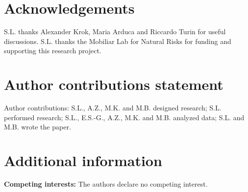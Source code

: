 \documentclass[twocolumn,fleqn,10pt]{wlscirep}
\begin{document}
% 







\section*{Acknowledgements}


S.L. thanks Alexander Krok, Maria Arduca and Riccardo Turin for useful discussions. S.L. thanks the Mobiliar Lab for Natural Risks for funding and supporting this research project.




\section*{Author contributions statement}


Author contributions: S.L., A.Z., M.K. and M.B. designed research; S.L. performed research; S.L., E.S.-G., A.Z., M.K. and M.B. analyzed data; S.L. and M.B. wrote the paper.




\section*{Additional information}


\textbf{Competing interests:} The authors declare no competing interest.











\end{document}
